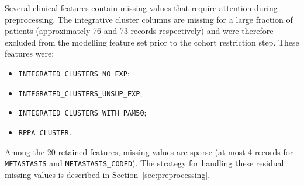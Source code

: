 




Several clinical features contain missing values that require attention during
preprocessing. The integrative cluster columns are
missing for a large fraction of patients (approximately 76 and 73 records
respectively) and were therefore excluded from the modelling feature set prior
to the cohort restriction step. These features were:
\begin{itemize}
    \item \texttt{INTEGRATED\_CLUSTERS\_NO\_EXP};
    \item \texttt{INTEGRATED\_CLUSTERS\_UNSUP\_EXP};
    \item \texttt{INTEGRATED\_CLUSTERS\_WITH\_PAM50};
    \item \texttt{RPPA\_CLUSTER.} 
\end{itemize}
Among the 20 retained features, missing values
are sparse (at most 4 records for \texttt{METASTASIS} and
\texttt{METASTASIS\_CODED}). The strategy for handling these residual
missing values is described in Section~\ref{sec:preprocessing}.

